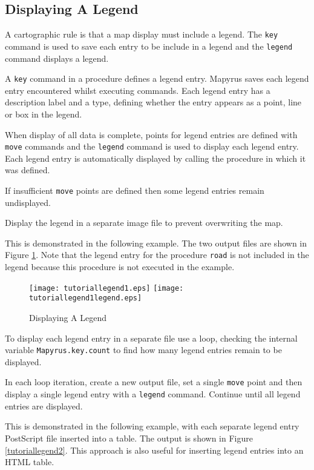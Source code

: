\subsection{Displaying A Legend}

A cartographic rule is that a map display must include a legend.  The
\texttt{key} command is used to save each entry to be include in a legend and
the \texttt{legend} command displays a legend.

A \texttt{key} command in a procedure defines a legend entry.  Mapyrus saves
each legend entry encountered whilst executing commands.  Each legend entry has
a description label and a type, defining whether the entry appears as a point,
line or box in the legend.

When display of all data is complete, points for legend entries are defined
with \texttt{move} commands and the \texttt{legend} command is used to display
each legend entry.  Each legend entry is automatically displayed by calling the
procedure in which it was defined.

If insufficient \texttt{move} points are defined then some legend entries
remain undisplayed.

Display the legend in a separate image file to prevent overwriting the map.

This is demonstrated in the following example.
The two output files are shown in Figure \ref{tutoriallegend1}.
Note that the legend entry for the procedure \texttt{road} is
not included in the legend because this procedure is not
executed in the example.



\begin{figure}[htb]
\texttt{[image: tutoriallegend1.eps]}
\texttt{[image: tutoriallegend1legend.eps]}
\caption{Displaying A Legend}
\label{tutoriallegend1}
\end{figure}

To display each legend entry in a separate file use a loop, checking the
internal variable \texttt{Mapyrus.key.count} to find how many legend entries
remain to be displayed.

In each loop iteration, create a new output file, set a single \texttt{move}
point and then display a single legend entry with a \texttt{legend} command.
Continue until all legend entries are displayed.

This is demonstrated in the following example, with each separate legend entry
PostScript file inserted into a table.  The output is shown in Figure
\ref{tutoriallegend2}.  This approach is also useful for inserting legend
entries into an HTML table.

